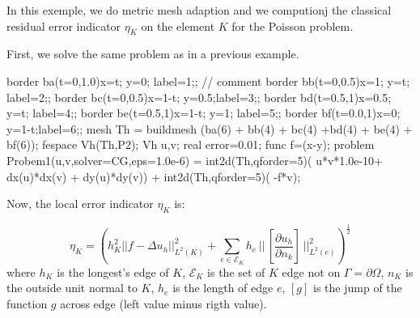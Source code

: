 \documentclass[twoside]{book}
\newif\ifpdf
\begin{document}
\graphicspath{{./}{plots/}}
\ifpdf
\DeclareGraphicsExtensions{.pdf, .jpg, .tif}
\else
{}
\fi

\let\subsubsection\subsection
\let\subsection\section
\let\section\chapter



In this exemple,  we do metric mesh adaption and we computionj the classical 
residual error indicator $\eta_{K}$ on the element $K$ for the Poisson problem.

First, we solve the same problem as in a previous example.
\bFF

border ba(t=0,1.0){x=t;   y=0;  label=1;}; // comment 
border bb(t=0,0.5){x=1;   y=t;  label=2;};
border bc(t=0,0.5){x=1-t; y=0.5;label=3;};
border bd(t=0.5,1){x=0.5; y=t;  label=4;};
border be(t=0.5,1){x=1-t; y=1;  label=5;};
border bf(t=0.0,1){x=0;   y=1-t;label=6;};
mesh Th = buildmesh (ba(6) + bb(4) + bc(4) +bd(4) + be(4) + bf(6));
fespace Vh(Th,P2);
Vh u,v;
real error=0.01;
func f=(x-y);
problem Probem1(u,v,solver=CG,eps=1.0e-6) =   int2d(Th,qforder=5)( u*v*1.0e-10+  dx(u)*dx(v) + dy(u)*dy(v))  + int2d(Th,qforder=5)( -f*v);
\eFF

Now, the local  error indicator $\eta_{K}$ is:
\def\Th{\mathcal{T}_{h}}
\def\AK{\mathcal{E}_{K}}

  $$\eta_{K} =\left(  h_{K}^{2} || f -\Delta u_{{h}} ||_{L^{2}(K)}^{2} +\sum_{e\in \AK} h_{e} \,||\, [ \frac{\partial u_{h}}{\partial n_{k}}] \,||^{2}_{L^{2}(e)} \right)^{\frac{1}{2}}
   $$
   where $h_{K}$ is the longest's edge of  $K$, $\AK$ is the set of $K$ edge not on 
      $\Gamma=\partial \Omega$, $n_{K}$ is the  outside unit normal to $K$, $h_{e}$ is the length of edge $e$,
   $[ g ]$ is the jump of the function $g$ across edge (left value minus rigth value). 
 
\end{document}
